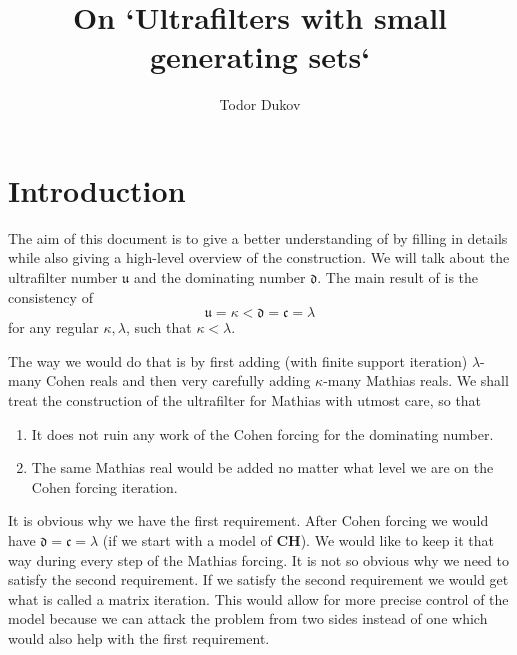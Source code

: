 \documentclass[12pt]{article}\usepackage[english]{babel}
\title{On `Ultrafilters with small generating sets`}
\author{Todor Dukov}
\newcommand{\continuum}{\mathfrak{c}}
\newcommand{\ufnumber}{\mathfrak{u}}
\newcommand{\domnumber}{\mathfrak{d}}
\theoremstyle{definition}
\theoremstyle{remark}
\begin{document}
\maketitle

\section*{Introduction}

The aim of this document is to give a better understanding of \cite{BlassShelah1989} by filling in details while also giving a high-level overview of the construction.
We will talk about the ultrafilter number $\ufnumber$ and the dominating number $\domnumber$.
The main result of \cite{BlassShelah1989} is the consistency of
\[
  \ufnumber = \kappa < \domnumber = \continuum = \lambda
\]
for any regular $\kappa, \lambda$, such that $\kappa < \lambda$.

The way we would do that is by first adding (with finite support iteration) $\lambda$-many Cohen reals and then very carefully adding $\kappa$-many Mathias reals.
We shall treat the construction of the ultrafilter for Mathias with utmost care, so that
\begin{enumerate}
  \item It does not ruin any work of the Cohen forcing for the dominating number.
  \item The same Mathias real would be added no matter what level we are on the Cohen forcing iteration.
\end{enumerate}
It is obvious why we have the first requirement.
After Cohen forcing we would have $\domnumber = \continuum = \lambda$ (if we start with a model of \textbf{CH}).
We would like to keep it that way during every step of the Mathias forcing.
It is not so obvious why we need to satisfy the second requirement.
If we satisfy the second requirement we would get what is called a matrix iteration.
This would allow for more precise control of the model because we can attack the problem from two sides instead of one which would also help with the first requirement.
\end{document}
